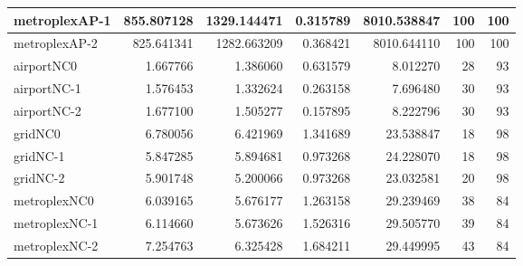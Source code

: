 \begin{longtable}{|l|r|r|r|r|r|r|}
metroplexAP-1 & 855.807128 & 1329.144471 & 0.315789 & 8010.538847 & 100 & 100 \\ \hline
metroplexAP-2 & 825.641341 & 1282.663209 & 0.368421 & 8010.644110 & 100 & 100 \\ \hline
airportNC0 & 1.667766 & 1.386060 & 0.631579 & 8.012270 & 28 & 93 \\ \hline
airportNC-1 & 1.576453 & 1.332624 & 0.263158 & 7.696480 & 30 & 93 \\ \hline
airportNC-2 & 1.677100 & 1.505277 & 0.157895 & 8.222796 & 30 & 93 \\ \hline
gridNC0 & 6.780056 & 6.421969 & 1.341689 & 23.538847 & 18 & 98 \\ \hline
gridNC-1 & 5.847285 & 5.894681 & 0.973268 & 24.228070 & 18 & 98 \\ \hline
gridNC-2 & 5.901748 & 5.200066 & 0.973268 & 23.032581 & 20 & 98 \\ \hline
metroplexNC0 & 6.039165 & 5.676177 & 1.263158 & 29.239469 & 38 & 84 \\ \hline
metroplexNC-1 & 6.114660 & 5.673626 & 1.526316 & 29.505770 & 39 & 84 \\ \hline
metroplexNC-2 & 7.254763 & 6.325428 & 1.684211 & 29.449995 & 43 & 84 \\ \hline
\end{longtable}
